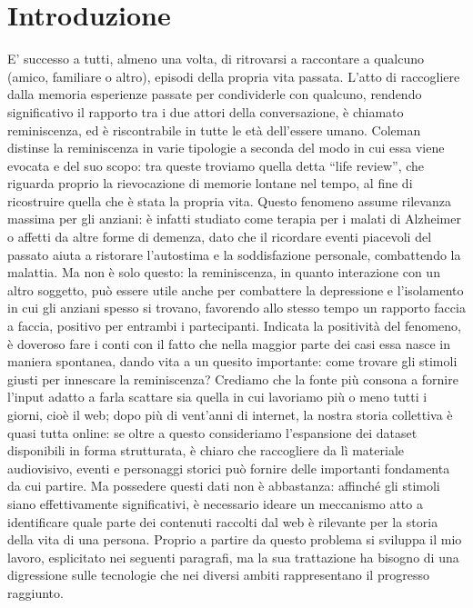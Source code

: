 \documentclass[sigproc-sp.tex]{subfiles}
\begin{document}
\section{Introduzione}
E’ successo a tutti, almeno una volta, di ritrovarsi a raccontare a qualcuno (amico, familiare o altro), episodi della propria vita passata. L’atto di raccogliere dalla memoria esperienze passate per condividerle con qualcuno, rendendo significativo il rapporto tra i due attori della conversazione, è chiamato reminiscenza, ed è riscontrabile in tutte le età dell’essere umano.
Coleman distinse la reminiscenza in varie tipologie a seconda del modo in cui essa viene evocata e del suo scopo: tra queste troviamo quella detta “life review”, che riguarda proprio la rievocazione di memorie lontane nel tempo, al fine di ricostruire quella che è stata la propria vita\cite{coleman1974measuring}.
Questo fenomeno assume rilevanza massima per gli anziani: è infatti studiato come terapia per i malati di Alzheimer o affetti da altre forme di demenza, dato che il ricordare eventi piacevoli del passato aiuta a ristorare l’autostima e la soddisfazione personale, combattendo la malattia.
Ma non è solo questo: la reminiscenza, in quanto interazione con un altro soggetto, può essere utile anche per combattere la depressione e l’isolamento in cui gli anziani spesso si trovano, favorendo allo stesso tempo un rapporto faccia a faccia, positivo per entrambi i partecipanti.
Indicata la positività del fenomeno, è doveroso fare i conti con il fatto che nella maggior parte dei casi essa nasce in maniera spontanea, dando vita a un quesito importante: come trovare gli stimoli giusti per innescare la reminiscenza? Crediamo che la fonte più consona a fornire l’input adatto a farla scattare sia quella in cui lavoriamo più o meno tutti i giorni, cioè il web; dopo più di vent’anni di internet, la nostra storia collettiva è quasi tutta online: se oltre a questo consideriamo l’espansione dei dataset disponibili in forma strutturata, è chiaro che raccogliere da lì materiale audiovisivo, eventi e personaggi storici può fornire delle importanti fondamenta da cui partire.
Ma possedere questi dati non è abbastanza: affinché gli stimoli siano effettivamente significativi, è necessario ideare un meccanismo atto a identificare quale parte dei contenuti raccolti dal web è rilevante per la storia della vita di una persona. Proprio a partire da questo problema si sviluppa il mio lavoro, esplicitato nei seguenti paragrafi, ma la sua trattazione ha bisogno di una digressione sulle tecnologie che nei diversi ambiti rappresentano il progresso raggiunto.
\vspace*{1\baselineskip}
\end{document}
